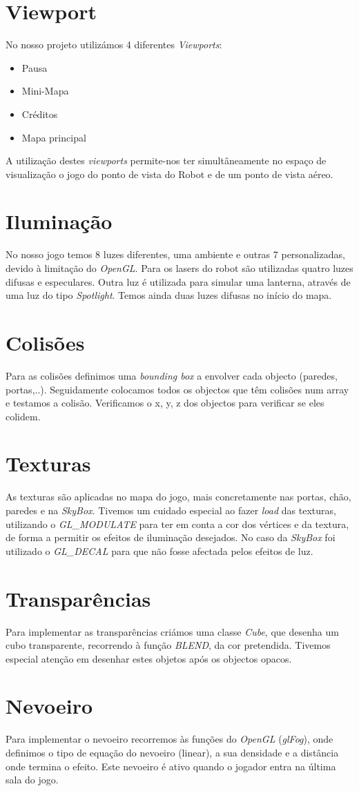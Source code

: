 \documentclass[12pt]{article}
\begin{document}
\section{Viewport}
No nosso projeto utilizámos 4 diferentes \emph{Viewports}:
\begin{itemize}
	\item Pausa
	\item Mini-Mapa
	\item Créditos
	\item Mapa principal
\end{itemize}
A utilização destes \emph{viewports} permite-nos ter simultâneamente no espaço de visualização o jogo do ponto de vista do Robot e de um ponto de vista aéreo. 

\section{Iluminação}
No nosso jogo temos 8 luzes diferentes, uma ambiente e outras 7 personalizadas, devido à limitação do \emph{OpenGL}.  Para os lasers do robot são utilizadas quatro luzes difusas e especulares. Outra luz é utilizada para simular uma lanterna, através de uma luz do tipo \emph{Spotlight}. Temos ainda duas luzes difusas no início do mapa.

\section{Colisões}
Para as colisões definimos uma \emph{bounding box} a envolver cada objecto (paredes, portas,..). Seguidamente colocamos todos os objectos que têm colisões num array e testamos a colisão. Verificamos o x, y, z dos objectos para verificar se eles colidem.

\section{Texturas}
As texturas são aplicadas no mapa do jogo, mais concretamente nas portas, chão, paredes e na \emph{SkyBox}. Tivemos um cuidado especial ao fazer \emph{load} das texturas, utilizando o \emph{GL\_MODULATE} para ter em conta a cor dos vértices e da textura, de forma a permitir os efeitos de iluminação desejados. No caso da \emph{SkyBox} foi utilizado o \emph{GL\_DECAL} para que não fosse afectada pelos efeitos de luz.

\section{Transparências}
Para implementar as transparências criámos uma classe \emph{Cube}, que desenha um cubo transparente, recorrendo à função \emph{BLEND}, da cor pretendida. Tivemos especial atenção em desenhar estes objetos após os objectos opacos.   

\section{Nevoeiro}
Para implementar o nevoeiro recorremos às funções do \emph{OpenGL} (\emph{glFog}), onde definimos o tipo de equação do nevoeiro (linear), a sua densidade e a distância onde termina o efeito. Este nevoeiro é ativo quando o jogador entra na última sala do jogo.
\end{document}
